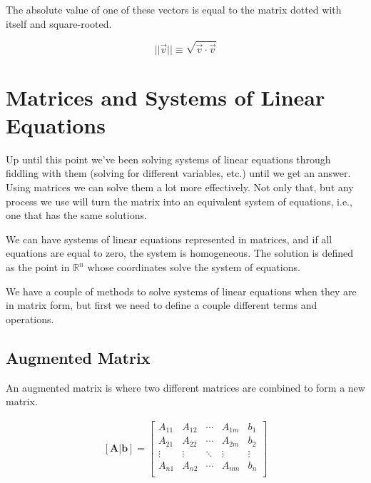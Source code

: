     The absolute value of one of these vectors is equal to the matrix dotted with itself and square-rooted.

    \begin{equation}\label{eq:matrix_abs_val}
        ||\vec{v}|| \equiv \sqrt{\vec{v} \cdot \vec{v} }
    \end{equation}

\section{Matrices and Systems of Linear Equations}
Up until this point we've been solving systems of linear equations through fiddling with them (solving for different variables, etc.) until we get an answer. Using matrices we can solve them a lot more effectively. Not only that, but any process we use will turn the matrix into an equivalent system of equations, i.e., one that has the same solutions.

We can have systems of linear equations represented in matrices, and if all equations are equal to zero, the system is homogeneous. The solution is defined as the point in $\mathbb{R}^n$ whose coordinates solve the system of equations.

We have a couple of methods to solve systems of linear equations when they are in matrix form, but first we need to define a couple different terms and operations.

    \subsection{Augmented Matrix}
    An augmented matrix is where two different matrices are combined to form a new matrix.

    \begin{equation}\label{eq:augmented_matrix}
    \begin{aligned}
        \mathbf{[A|b]}=
        \left[\begin{array}{cccc|c}
        A_{11} & A_{12} & \cdots & A_{1m} & b_1\\
        A_{21} & A_{22} & \cdots & A_{2m} & b_2\\
        \vdots & \vdots & \ddots & \vdots & \vdots\\
        A_{n1} & A_{n2} & \cdots & A_{nm} & b_n\\
        \end{array}\right]\\
    \end{aligned}
    \end{equation}

